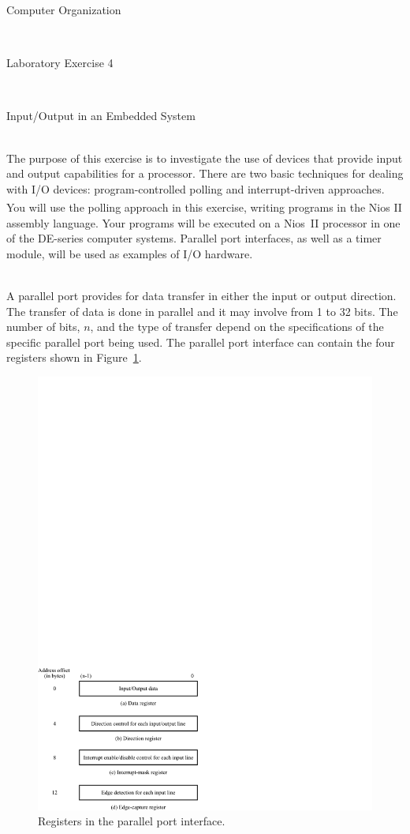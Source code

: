 \documentclass[epsfig,10pt,fullpage]{article}
\newcommand{\LabNum}{4}
\begin{document}
\centerline{\huge Computer Organization}
~\\
\centerline{\huge Laboratory Exercise \LabNum}
~\\
\centerline{\large Input/Output in an Embedded System}
~\\

The purpose of this exercise is to investigate the use of devices that provide input and
output capabilities for a processor. There are two basic techniques for dealing with I/O devices:
program-controlled polling and interrupt-driven approaches.  You will use the polling approach 
in this exercise, writing programs in the Nios\textsuperscript{\textregistered} II assembly language.  Your programs will 
be executed on a Nios~II processor in one of the DE-series computer systems.
Parallel port interfaces, as well as a timer module, will be used as examples of I/O hardware.

~\\
A parallel port provides for data transfer in either the input or output direction.  The 
transfer of data is done in parallel and it may involve from 1 to 32 bits. The number of
bits, $n$, and the type of transfer depend on the specifications of the specific parallel port 
being used.  The parallel port interface can contain the four registers shown in
Figure~\ref{fig:parallel}.

\begin{figure}[H]
	\begin{center}
	\includegraphics[scale=1]{figures/figureparallel.pdf}
	\end{center}
	\caption{Registers in the parallel port interface.}
\label{fig:parallel}
\end{figure}
\end{document}
